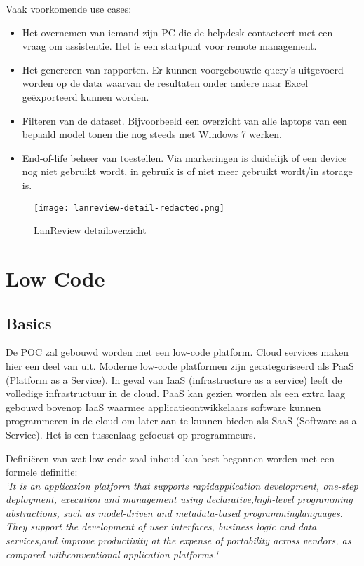 Vaak voorkomende use cases:
\begin{itemize}
    \item Het overnemen van iemand zijn PC die de helpdesk contacteert met een vraag om assistentie. Het is een startpunt voor remote management.
    \item Het genereren van rapporten. Er kunnen voorgebouwde query's uitgevoerd worden op de data waarvan de resultaten onder andere naar Excel geëxporteerd kunnen worden.
    \item Filteren van de dataset. Bijvoorbeeld een overzicht van alle laptops van een bepaald model tonen die nog steeds met Windows 7 werken.
    \item End-of-life beheer van toestellen. Via markeringen is duidelijk of een device nog niet gebruikt wordt, in gebruik is of niet meer gebruikt wordt/in storage is.
\end{itemize}


\begin{figure}[h!]
    \texttt{[image: lanreview-detail-redacted.png]}
    \caption{LanReview detailoverzicht}
    \label{fig:lr-detail}
\end{figure}

\section{Low Code}

\subsection{Basics}

De POC zal gebouwd worden met een low-code platform. Cloud services maken hier een deel van uit. Moderne low-code platformen zijn gecategoriseerd als PaaS (Platform as a Service). In geval van IaaS (infrastructure as a service) leeft de volledige infrastructuur in de cloud. PaaS kan gezien worden als een extra laag gebouwd bovenop IaaS waarmee applicatieontwikkelaars software kunnen programmeren in de cloud om later aan te kunnen bieden als SaaS (Software as a Service). Het is een tussenlaag gefocust op programmeurs. \autocite{Nucleus2017}

Definiëren van wat low-code zoal inhoud kan best begonnen worden met een formele definitie:\\
\textit{`It is an application platform that supports rapidapplication development, one-step deployment, execution and management using declarative,high-level programming abstractions, such as model-driven and metadata-based programminglanguages. They support the development of user interfaces, business logic and data services,and improve productivity at the expense of portability across vendors, as compared withconventional application platforms.`} \autocite{Vincent2019}

